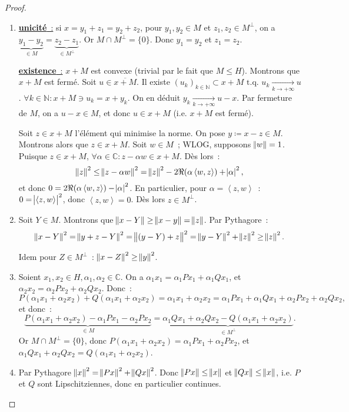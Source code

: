 \documentclass{report}
\newcommand{\C}{{\mathbb C}}
\newcommand{\N}{{\mathbb N}}
\newcommand{\scpr}[2]{\left\langle#1, #2\right\rangle}
\newcommand{\tq}{\text{ t.q. }}
\newcommand{\pinfty}{{+\infty}}
\newcommand{\unic}{{\underline {\textbf{unicité}~:}} }
\newcommand{\exis}{{\underline {\textbf{existence}~:}} }
\theoremstyle{definition}
\theoremstyle{remark}
\begin{document}
\begin{proof}~
\begin{enumerate}
	\item \unic si $x = y_1+z_1 = y_2+z_2$, pour $y_1,y_2 \in M$ et $z_1,z_2 \in M^\perp$, on a
	$\underbrace {y_1-y_2}_{\in M} = \underbrace {z_2-z_1}_{\in M^\perp}$. Or $M \cap M^\perp = \{0\}$. Donc $y_1=y_2$ et $z_1=z_2$.

 	\exis $x+M$ est convexe (trivial par le fait que $M \leq H$). Montrons que $x+M$ est fermé. Soit $u \in \overline {x+M}$.
	Il existe $(u_k)_{k \in \N} \subset x+M \tq u_k \xrightarrow[k \to \pinfty]{} u$. $\forall k \in \N : x+M \ni u_k = x + y_k$. On en déduit
	$y_k \xrightarrow[k \to \pinfty]{} u-x$. Par fermeture de $M$, on a $u-x \in M$, et donc $u \in x+M$ (i.e. $x+M$ est fermé).

	Soit $z \in x+M$ l'élément qui minimise la norme. On pose $y \coloneqq x-z \in M$. Montrons alors que $z \in x+M$. Soit $w \in M$~; WLOG, supposons $\norm w = 1$.
	Puisque $z \in x+M$, $\forall \alpha \in \C : z-\alpha w \in x+M$. Dès lors~:
	\[\norm z^2 \leq \norm {z-\alpha w}^2 = \norm z^2 - 2\Re(\alpha\scpr wz) + \abs\alpha^2,\]
	et donc $0 = 2\Re(\alpha\scpr wz) - \abs\alpha^2$. En particulier, pour $\alpha = \scpr zw$~: $0 = \abs {\scpr zw}^2$, donc $\scpr zw = 0$. Dès lors $z \in M^\perp$.

	\item Soit $Y \in M$. Montrons que $\norm {x-Y} \geq \norm {x-y} = \norm z$. Par Pythagore~:
	\[\norm {x-Y}^2 = \norm {y+z-Y}^2 = \norm {(y-Y) + z}^2 = \norm {y-Y}^2 + \norm z^2 \geq \norm z^2.\]

	Idem pour $Z \in M^\perp$~: $\norm {x-Z}^2 \geq \norm y^2$.

	\item Soient $x_1, x_2 \in H, \alpha_1, \alpha_2 \in \C$. On a $\alpha_1x_1 = \alpha_1Px_1 + \alpha_1Qx_1$, et $\alpha_2x_2 = \alpha_2Px_2 + \alpha_2Qx_2$. Donc~:
	\[P(\alpha_1x_1+\alpha_2x_2) + Q(\alpha_1x_1 + \alpha_2x_2) = \alpha_1x_1 + \alpha_2x_2 = \alpha_1Px_1 + \alpha_1Qx_1 + \alpha_2Px_2 + \alpha_2Qx_2,\]
	et donc~:
	\[\underbrace {P(\alpha_1x_1+\alpha_2x_2) - \alpha_1Px_1 - \alpha_2Px_2}_{\in M} = \underbrace {\alpha_1Qx_1 + \alpha_2Qx_2 - Q(\alpha_1x_1 + \alpha_2x_2)}_{\in M^\perp}.\]
	Or $M \cap M^\perp = \{0\}$, donc $P(\alpha_1x_1+\alpha_2x_2) = \alpha_1Px_1 + \alpha_2Px_2$, et $\alpha_1Qx_1 + \alpha_2Qx_2 = Q(\alpha_1x_1 + \alpha_2x_2)$.

	\item Par Pythagore $\norm x^2 = \norm {Px}^2 + \norm {Qx}^2$. Donc $\norm {Px} \leq \norm x$ et $\norm {Qx} \leq \norm x$, i.e. $P$ et $Q$ sont Lipschitziennes,
	donc en particulier continues.
\end{enumerate}
\end{proof}
\end{document}
